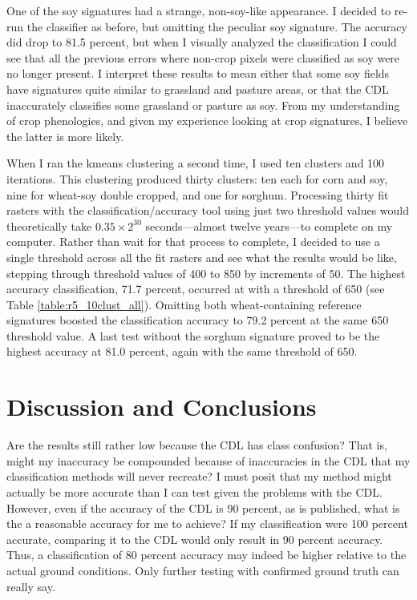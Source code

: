 One of the soy signatures had a strange, non-soy-like appearance. I decided to re-run the classifier as before, but omitting the peculiar soy signature. The accuracy did drop to 81.5 percent, but when I visually analyzed the classification I could see that all the previous errors where non-crop pixels were classified as soy were no longer present. I interpret these results to mean either that some soy fields have signatures quite similar to grassland and pasture areas, or that the CDL inaccurately classifies some grassland or pasture as soy. From my understanding of crop phenologies, and given my experience looking at crop signatures, I believe the latter is more likely.  %

When I ran the kmeans clustering a second time, I used ten clusters and 100 iterations. This clustering produced thirty clusters: ten each for corn and soy, nine for wheat-soy double cropped, and one for sorghum. Processing thirty fit rasters with the classification/accuracy tool using just two threshold values would theoretically take $0.35\times2^{30}$ seconds---almost twelve years---to complete on my computer. Rather than wait for that process to complete, I decided to use a single threshold across all the fit rasters and see what the results would be like, stepping through threshold values of 400 to 850 by increments of 50. The highest accuracy classification, 71.7 percent, occurred at with a threshold of 650 (see Table \ref{table:r5_10clust_all}). Omitting both wheat-containing reference signatures boosted the classification accuracy to 79.2 percent at the same 650 threshold value. A last test without the sorghum signature proved to be the highest accuracy at 81.0 percent, again with the same threshold of 650.

\section{Discussion and Conclusions}

Are the results still rather low because the CDL has class confusion? That is, might my inaccuracy be compounded because of inaccuracies in the CDL that my classification methods will never recreate? I must posit that my method might actually be more accurate than I can test given the problems with the CDL. However, even if the accuracy of the CDL is 90 percent, as is published, what is the a reasonable accuracy for me to achieve? If my classification were 100 percent accurate, comparing it to the CDL would only result in 90 percent accuracy. Thus, a classification of 80 percent accuracy may indeed be higher relative to the actual ground conditions. Only further testing with confirmed ground truth can really say.